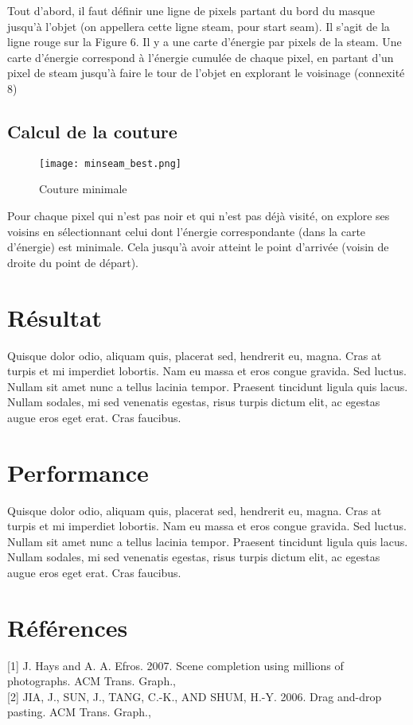 \documentclass[a4paper]{article}
\begin{document}
Tout d'abord, il faut définir une ligne de pixels partant du bord du masque jusqu'à l’objet (on appellera cette ligne steam, pour start seam). Il s'agit de la ligne rouge sur la Figure 6.
Il y a une carte d’énergie par pixels de la steam.
Une carte d’énergie correspond à l’énergie cumulée de chaque pixel, en partant d’un pixel de steam jusqu’à faire le tour de l’objet en explorant le voisinage (connexité 8)

\subsection{Calcul de la couture}

\begin{figure}[!h]
    	\centering \texttt{[image: minseam\_best.png]}
    	\caption{Couture minimale}
        \label{meanseam}
\end{figure}
Pour chaque pixel qui n’est pas noir et qui n’est pas déjà visité, on explore ses voisins en sélectionnant celui dont l’énergie correspondante (dans la carte d’énergie) est minimale. Cela jusqu'à avoir atteint le point d'arrivée (voisin de droite du point de départ).

\section{Résultat}

Quisque dolor odio, aliquam quis, placerat sed, hendrerit eu, magna. Cras at
turpis et mi imperdiet lobortis. Nam eu massa et eros congue gravida. Sed
luctus. Nullam sit amet nunc a tellus lacinia tempor. Praesent tincidunt ligula
quis lacus. Nullam sodales, mi sed venenatis egestas, risus turpis dictum elit,
ac egestas augue eros eget erat. Cras faucibus.

\section{Performance}

Quisque dolor odio, aliquam quis, placerat sed, hendrerit eu, magna. Cras at
turpis et mi imperdiet lobortis. Nam eu massa et eros congue gravida. Sed
luctus. Nullam sit amet nunc a tellus lacinia tempor. Praesent tincidunt ligula
quis lacus. Nullam sodales, mi sed venenatis egestas, risus turpis dictum elit,
ac egestas augue eros eget erat. Cras faucibus.

\section{Références}

[1] J. Hays and A. A. Efros.  2007. Scene completion using millions of photographs. ACM Trans. Graph.,
\\

[2] JIA, J., SUN, J., TANG, C.-K., AND SHUM, H.-Y. 2006. Drag and-drop pasting. ACM Trans. Graph.,
\end{document}
